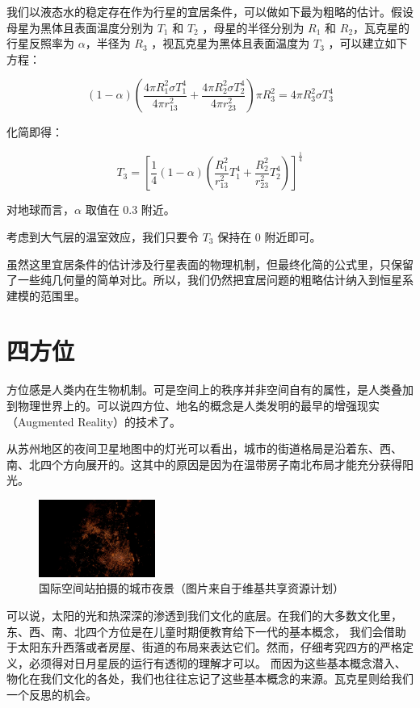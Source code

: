 \documentclass[a4paper,10.5pt]{book}
\begin{document}
我们以液态水的稳定存在作为行星的宜居条件，可以做如下最为粗略的估计。假设母星为黑体且表面温度分别为 $T_1$ 和 $T_2$ ，母星的半径分别为 $R_1$ 和 $R_2$，瓦克星的行星反照率为 $\alpha$，半径为 $R_3$ ，视瓦克星为黑体且表面温度为 $T_3$  ，可以建立如下方程：

$$\left ( 1 - \alpha \right ) \left(  \frac{4 \pi R_1^2 \sigma T_1^4} {4 \pi r_{13}^2} + \frac{4 \pi R_2^2 \sigma T_2^4} {4 \pi r_{23}^2} \right ) \pi R_3^2= 4 \pi R_3^2 \sigma T_3^4$$

化简即得：

$$T_3 = \left[ \frac{1}{4} \left( 1 - \alpha \right ) \left( \frac{R_1^2}{r_{13}^2} T_1^4 + \frac{R_2^2}{r_{23}^2} T_2^4 \right ) \right ]^{\frac{1}{4}}$$

对地球而言，$\alpha$ 取值在 0.3 附近。

考虑到大气层的温室效应，我们只要令 $T_3$ 保持在 0 附近即可。

虽然这里宜居条件的估计涉及行星表面的物理机制，但最终化简的公式里，只保留了一些纯几何量的简单对比。所以，我们仍然把宜居问题的粗略估计纳入到恒星系建模的范围里。

\section{四方位}

方位感是人类内在生物机制。可是空间上的秩序并非空间自有的属性，是人类叠加到物理世界上的。可以说四方位、地名的概念是人类发明的最早的增强现实（Augmented Reality）的技术了。

从苏州地区的夜间卫星地图中的灯光可以看出，城市的街道格局是沿着东、西、南、北四个方向展开的。这其中的原因是因为在温带房子南北布局才能充分获得阳光。

\begin{figure}[ht]
\centering
\includegraphics[width=1.5in]{images/4_01-ISS-30_Nighttime_view_of_Shanghai.jpg}
\caption{国际空间站拍摄的城市夜景（图片来自于维基共享资源计划）}
\end{figure}

可以说，太阳的光和热深深的渗透到我们文化的底层。在我们的大多数文化里，东、西、南、北四个方位是在儿童时期便教育给下一代的基本概念，
我们会借助于太阳东升西落或者房屋、街道的布局来表达它们。然而，仔细考究四方的严格定义，必须得对日月星辰的运行有透彻的理解才可以。
而因为这些基本概念潜入、物化在我们文化的各处，我们也往往忘记了这些基本概念的来源。瓦克星则给我们一个反思的机会。
\end{document}

